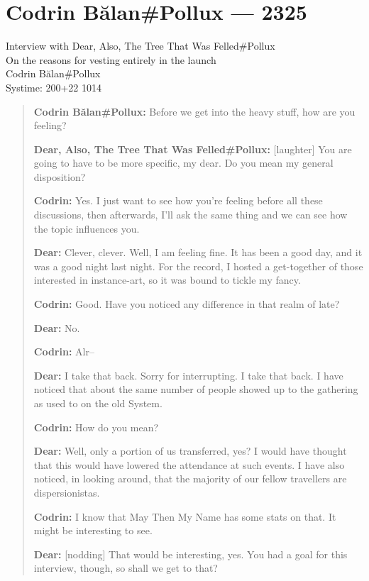 \hypertarget{codrin-bux103lanpollux-2325}{%
\chapter{Codrin Bălan\#Pollux — 2325}\label{codrin-bux103lanpollux-2325}}

Interview with Dear, Also, The Tree That Was Felled\#Pollux\\
On the reasons for vesting entirely in the launch\\
Codrin Bălan\#Pollux\\
Systime: 200+22 1014

\begin{quote}
\textbf{Codrin Bălan\#Pollux:} Before we get into the heavy stuff, how are you feeling?

\textbf{Dear, Also, The Tree That Was Felled\#Pollux:} {[}laughter{]} You are going to have to be more specific, my dear. Do you mean my general disposition?

\textbf{Codrin:} Yes. I just want to see how you're feeling before all these discussions, then afterwards, I'll ask the same thing and we can see how the topic influences you.

\textbf{Dear:} Clever, clever. Well, I am feeling fine. It has been a good day, and it was a good night last night. For the record, I hosted a get-together of those interested in instance-art, so it was bound to tickle my fancy.

\textbf{Codrin:} Good. Have you noticed any difference in that realm of late?

\textbf{Dear:} No.

\textbf{Codrin:} Alr--

\textbf{Dear:} I take that back. Sorry for interrupting. I take that back. I have noticed that about the same number of people showed up to the gathering as used to on the old System.

\textbf{Codrin:} How do you mean?

\textbf{Dear:} Well, only a portion of us transferred, yes? I would have thought that this would have lowered the attendance at such events. I have also noticed, in looking around, that the majority of our fellow travellers are dispersionistas.

\textbf{Codrin:} I know that May Then My Name has some stats on that. It might be interesting to see.

\textbf{Dear:} {[}nodding{]} That would be interesting, yes. You had a goal for this interview, though, so shall we get to that?


\end{quote}
